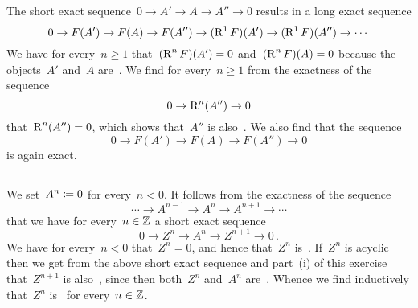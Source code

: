 \section{}





\subsection{}

The short exact sequence~$0 \to A' \to A \to A'' \to 0$ results in a long exact sequence
\[
  0
  \to
  F(A')
  \to
  F(A)
  \to
  F(A'')
  \to
  (\operatorname{R}^1 F)(A')
  \to
  (\operatorname{R}^1 F)(A'')
  \to
  \dotsb
\]
We have for every~$n \geq 1$ that~$(\operatorname{R}^n F)(A') = 0$ and~$(\operatorname{R}^n F)(A) = 0$ because the objects~$A'$ and~$A$ are~.
We find for every~$n \geq 1$ from the exactness of the sequence
\[
  0
  \to
  \operatorname{R}^n(A'')
  \to
  0
\]
that~$\operatorname{R}^n(A'') = 0$, which shows that~$A''$ is also~.
We also find that the sequence
\[
  0
  \to
  F(A')
  \to
  F(A)
  \to
  F(A'')
  \to
  0
\]
is again exact.





\subsection{}

We set~$A^n \coloneqq 0$ for every~$n < 0$.
It follows from the exactness of the sequence
\[
  \dotsb
  \to
  A^{n-1}
  \to
  A^n
  \to
  A^{n+1}
  \to
  \dotsb
\]
that we have for every~$n \in \mathbb{Z}$ a short exact sequence
\[
  0
  \to
  Z^n
  \to
  A^n
  \to
  Z^{n+1}
  \to
  0 \,.
\]
We have for every~$n < 0$ that~$Z^n = 0$, and hence that~$Z^n$ is~.
If~$Z^n$ is acyclic then we get from the above short exact sequence and part~(i) of this exercise that~$Z^{n+1}$ is also~, since then both~$Z^n$ and~$A^n$ are~.
Whence we find inductively that~$Z^n$ is~ for every~$n \in \mathbb{Z}$.





\addtocounter{subsection}{1}





